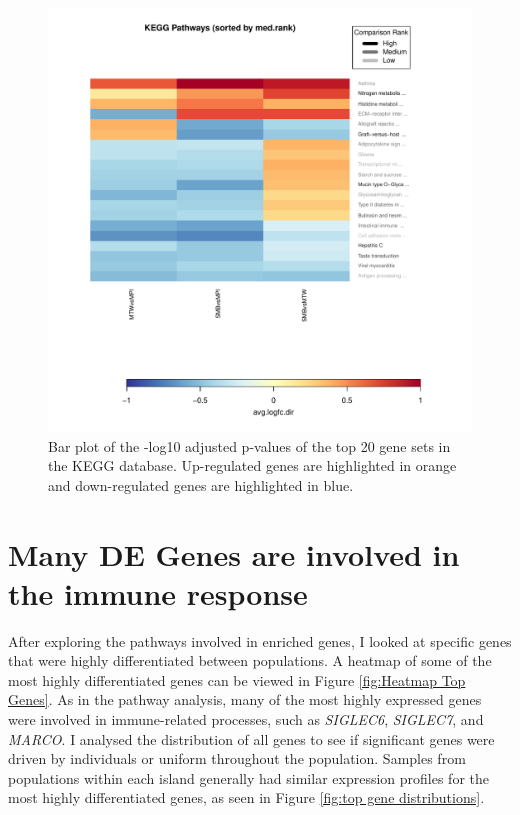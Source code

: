 \documentclass[12pt,a4paper,titlepage,twoside,openright]{book}
\begin{document}
\begin{mainmatter}
{\begin{figure}[htb!]
\centering
\includegraphics[width=\textwidth,height=\textheight,keepaspectratio]{Figures/summary_heatmaps_kegg.pdf}
\caption{Bar plot of the -log10 adjusted p-values of the top 20 gene sets in the KEGG database. Up-regulated genes are highlighted in orange and down-regulated genes are highlighted in blue.}
\label{fig:Kegg Heatmap}
\end{figure}


\section{Many DE Genes are involved in the immune response} 

After exploring the pathways involved in enriched genes, I looked at specific genes that were highly differentiated between populations. A heatmap of some of the most highly differentiated genes can be viewed in Figure \ref{fig:Heatmap Top Genes}. As in the pathway analysis, many of the most highly expressed genes were involved in immune-related processes, such as \textit{SIGLEC6}, \textit{SIGLEC7}, and \textit{MARCO}. I analysed the distribution of all genes to see if significant genes were driven by individuals or uniform throughout the population. Samples from populations within each island generally had similar expression profiles for the most highly differentiated genes, as seen in Figure \ref{fig:top gene distributions}.

}
\end{mainmatter}
\end{document}
